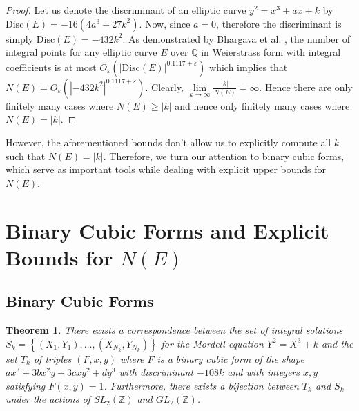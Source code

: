 \documentclass[12pt]{amsart}
\theoremstyle{plain}
\newtheorem{thm}{Theorem}
\theoremstyle{definition}
\theoremstyle{remark}
\numberwithin{equation}{section}
\numberwithin{thm}{section}
\theoremstyle{named}
\theoremstyle{named}
\begin{document}
\begin{proof}
Let us denote the discriminant of an elliptic curve $y^2 = x^3 + ax + k$ by $\mathrm{Disc}(E)  = -16(4a^3 + 27k^2).$ Now, since $a = 0$, therefore the discriminant is simply $\mathrm{Disc}(E) = -432k^2$. As demonstrated by {Bhargava et al}. \cite{bhargava2017bounds}, the number of integral points for any elliptic curve $E$ over $\mathbb Q$ in Weierstrass form with integral coefficients is at most $O_{\varepsilon}\left( |\mathrm{Disc}(E)|^{0.1117 + \varepsilon} \right)$ which implies that $N(E) = O_{\varepsilon}\left( |-432k^2|^{0.1117 + \varepsilon} \right)$. Clearly, $\lim \limits_{k \to \infty} \frac{|k|}{N(E)} = \infty$. Hence there are only finitely many cases where $N(E)  \ge |k|$ and hence only finitely many cases where $N(E) = |k|$.

\end{proof}
However, the aforementioned bounds don't allow us to explicitly compute all $k$ such that $N(E)=|k|$.
Therefore, we turn our attention to binary cubic forms, which serve as important tools while dealing with explicit upper bounds for 
$N(E)$. 
\section{Binary Cubic Forms and Explicit Bounds for $N(E)$} \label{BinaryCubic}
\subsection{Binary Cubic Forms}
\begin{thm}
    There exists a correspondence between the set of integral solutions $S_k=\left\{\left(X_1, Y_1\right), \ldots,\left(X_{N_k}, Y_{N_k}\right)\right\}$ for the Mordell equation $Y^2 = X^3 + k$ and the set  $T_k$ of triples $(F,x,y)$ where $F$ is a binary cubic form of the shape $ax^3 + 3bx^2y + 3cxy^2 + dy^3$ with discriminant $-108k$ and with integers $x,y$ satisfying $F(x,y) =1$. Furthermore, there exists a bijection between $T_k$ and $S_k$ under the actions of $SL_2(\mathbb Z) $ and $GL_2(\mathbb Z)$.
\end{thm}
\end{document}
